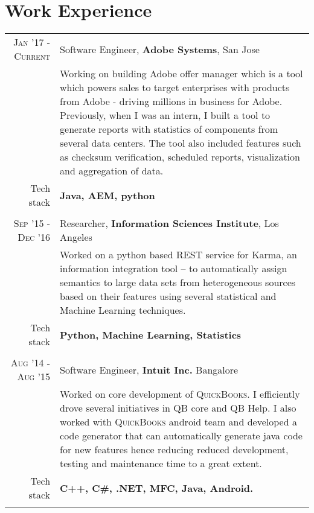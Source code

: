 \section{Work Experience}
\renewcommand{\arraystretch}{0.85}%
\begin{tabular}{r|p{13cm}}

\textsc{Jan '17 - Current} & Software Engineer, \textbf{Adobe Systems}, San Jose\\
& \small{Working on building Adobe offer manager which is a tool which powers sales to target enterprises with products from Adobe - driving millions in business for Adobe. Previously, when I was an intern, I built a tool to generate reports with statistics of components from several data centers. The tool also included features such as checksum verification, scheduled reports, visualization and aggregation of data.}\\
\small{Tech stack} &\footnotesize{\textbf{Java, AEM, python}} \\
\multicolumn{2}{c}{} \\

\textsc{Sep '15 - Dec '16} & Researcher, \textbf{Information Sciences Institute}, Los Angeles \\
& \small{Worked on a python based REST service for Karma, an information integration tool – to automatically assign semantics to large data sets from heterogeneous sources based on their features using several statistical and Machine Learning techniques.}\\
\small{Tech stack} &\footnotesize{\textbf{Python, Machine Learning, Statistics}} \\
\multicolumn{2}{c}{} \\


\textsc{Aug '14 - Aug '15 } & Software Engineer, \textbf{Intuit Inc.} Bangalore \\
& \small{Worked on core development of \textsc{QuickBooks}. I efficiently drove several initiatives in QB core and QB Help. I also worked with \textsc{QuickBooks} android team and developed a code generator that can automatically generate java code for new features hence reducing reduced development, testing and maintenance time to a great extent.}\\
\small{Tech stack} &\footnotesize{\textbf{C++, C\#, .NET, MFC, Java, Android.}} \\
\multicolumn{2}{c}{}


\end{tabular}
